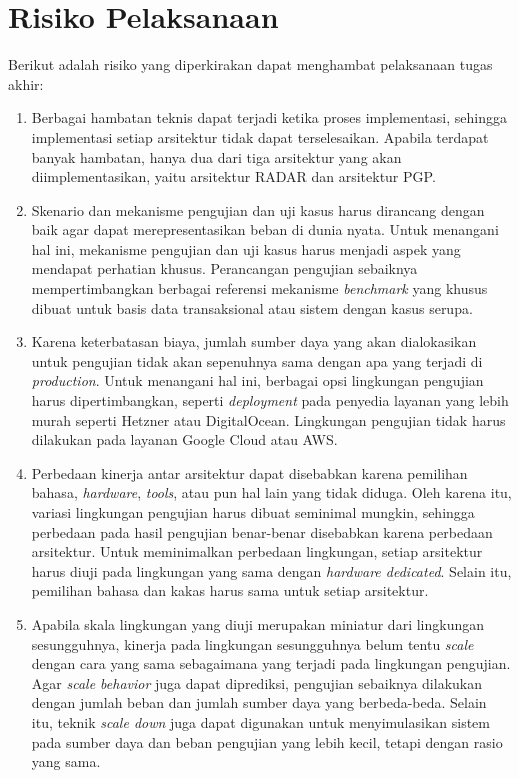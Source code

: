 \section{Risiko Pelaksanaan}

Berikut adalah risiko yang diperkirakan dapat menghambat pelaksanaan tugas akhir:

\begin{enumerate}
    \item Berbagai hambatan teknis dapat terjadi ketika proses implementasi, sehingga implementasi setiap arsitektur tidak dapat terselesaikan. Apabila terdapat banyak hambatan, hanya dua dari tiga arsitektur yang akan diimplementasikan, yaitu arsitektur RADAR dan arsitektur PGP.
    \item Skenario dan mekanisme pengujian dan uji kasus harus dirancang dengan baik agar dapat merepresentasikan beban di dunia nyata. Untuk menangani hal ini, mekanisme pengujian dan uji kasus harus menjadi aspek yang mendapat perhatian khusus. Perancangan pengujian sebaiknya mempertimbangkan berbagai referensi mekanisme \textit{benchmark} yang khusus dibuat untuk basis data transaksional atau sistem dengan kasus serupa.
    \item Karena keterbatasan biaya, jumlah sumber daya yang akan dialokasikan untuk pengujian tidak akan sepenuhnya sama dengan apa yang terjadi di \textit{production}. Untuk menangani hal ini, berbagai opsi lingkungan pengujian harus dipertimbangkan, seperti \textit{deployment} pada penyedia layanan yang lebih murah seperti Hetzner atau DigitalOcean. Lingkungan pengujian tidak harus dilakukan pada layanan Google Cloud atau AWS.
    \item Perbedaan kinerja antar arsitektur dapat disebabkan karena pemilihan bahasa, \textit{hardware}, \textit{tools}, atau pun hal lain yang tidak diduga. Oleh karena itu, variasi lingkungan pengujian harus dibuat seminimal mungkin, sehingga perbedaan pada hasil pengujian benar-benar disebabkan karena perbedaan arsitektur. Untuk meminimalkan perbedaan lingkungan, setiap arsitektur harus diuji pada lingkungan yang sama dengan \textit{hardware dedicated}. Selain itu, pemilihan bahasa dan kakas harus sama untuk setiap arsitektur.
    \item Apabila skala lingkungan yang diuji merupakan miniatur dari lingkungan sesungguhnya, kinerja pada lingkungan sesungguhnya belum tentu \textit{scale} dengan cara yang sama sebagaimana yang terjadi pada lingkungan pengujian. Agar \textit{scale behavior} juga dapat diprediksi, pengujian sebaiknya dilakukan dengan jumlah beban dan jumlah sumber daya yang berbeda-beda. Selain itu, teknik \textit{scale down} juga dapat digunakan untuk menyimulasikan sistem pada sumber daya dan beban pengujian yang lebih kecil, tetapi dengan rasio yang sama.
\end{enumerate}